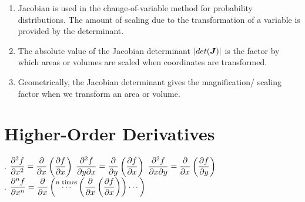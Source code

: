 \begin{enumerate}
\begin{enumerate}
        \item Jacobian is used in the change-of-variable method for probability distributions. 
        The amount of scaling due to the transformation of a variable is provided by the determinant.
        \hfill \cite{mfml/book/mml/Deisenroth-Faisal-Ong}

        \item The absolute value of the Jacobian determinant $\left| det(\bm{J}) \right|$ is the factor by which areas or volumes are scaled when coordinates are transformed.
        \hfill \cite{mfml/book/mml/Deisenroth-Faisal-Ong}

        \item Geometrically, the Jacobian determinant gives the magnification/ scaling factor when we transform an area or volume.
        \hfill \cite{mfml/book/mml/Deisenroth-Faisal-Ong}
    \end{enumerate}

\end{enumerate}







\section{Higher-Order Derivatives}

.\hfill
$
    \dfrac{\partial^2 f}{\partial x^2} = \dfrac{\partial}{\partial x} \left(\dfrac{\partial f}{\partial x}\right)
$
\hfill \vrule \hfill
$
    \dfrac{\partial^2 f}{\partial y \partial x} = \dfrac{\partial}{\partial y} \left(\dfrac{\partial f}{\partial x}\right)
$
\hfill \vrule \hfill
$
    \dfrac{\partial^2 f}{\partial x \partial y} = \dfrac{\partial}{\partial x} \left(\dfrac{\partial f}{\partial y}\right)
$
\hfill \cite{mfml/book/mml/Deisenroth-Faisal-Ong}
\\[0.2cm]
.\hfill
$
    \dfrac{\partial^n f}{\partial x^n} = 
    \dfrac{\partial}{\partial x} \left(
        \overset{n \text{ times}}{\cdots} 
        \left(\dfrac{\partial}{\partial x} \left(\dfrac{\partial f}{\partial x}\right)\right)
        \cdots
    \right)
$
\hfill \cite{mfml/book/mml/Deisenroth-Faisal-Ong}


